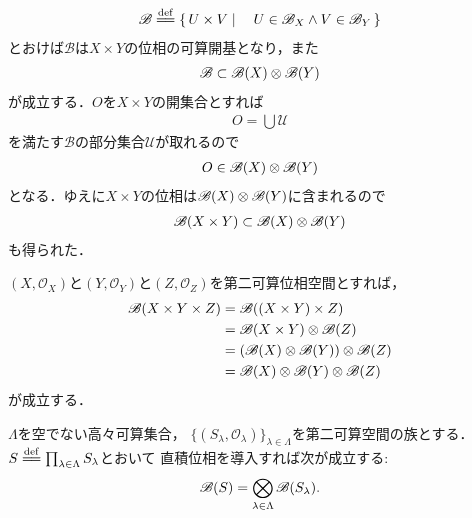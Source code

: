 \begin{sketch}
\begin{align}
			\mathscr{B} \defeq \Set{U \times V}{U \in \mathscr{B}_X \wedge V \in \mathscr{B}_Y}
		\end{align}
		とおけば$\mathscr{B}$は$X \times Y$の位相の可算開基となり，また
		\begin{align}
			\mathscr{B} \subset \mathscr{B}(X) \otimes \mathscr{B}(Y)
		\end{align}
		が成立する．$O$を$X \times Y$の開集合とすれば
		\begin{align}
			O = \bigcup \mathscr{U}
		\end{align}
		を満たす$\mathscr{B}$の部分集合$\mathscr{U}$が取れるので
		\begin{align}
			O \in \mathscr{B}(X) \otimes \mathscr{B}(Y)
		\end{align}
		となる．ゆえに$X \times Y$の位相は$\mathscr{B}(X) \otimes \mathscr{B}(Y)$に含まれるので
		\begin{align}
			\mathscr{B}(X \times Y) \subset \mathscr{B}(X) \otimes \mathscr{B}(Y)
		\end{align}
		も得られた．
		\QED
	\end{sketch}
	
	$(X,\mathscr{O}_X)$と$(Y,\mathscr{O}_Y)$と$(Z,\mathscr{O}_Z)$を第二可算位相空間とすれば，
	\begin{align}
		\mathscr{B}(X \times Y \times Z) &= \mathscr{B}((X \times Y) \times Z) \\
		&= \mathscr{B}(X \times Y) \otimes \mathscr{B}(Z) \\
		&= \left(\mathscr{B}(X) \otimes \mathscr{B}(Y)\right) \otimes \mathscr{B}(Z) \\
		&= \mathscr{B}(X) \otimes \mathscr{B}(Y) \otimes \mathscr{B}(Z)
	\end{align}
	が成立する．
	
	\begin{screen}
		\begin{thm}[第二可算空間の直積のBorel集合族]\label{thm:Borel_algebra_of_products_of_second_countable_spaces}
			$\Lambda$を空でない高々可算集合，
			$\{(S_\lambda,\mathscr{O}_\lambda)\}_{\lambda \in \Lambda}$を第二可算空間の族とする．
			$S \defeq \prod_{\lambda \in \Lambda} S_\lambda$とおいて
			直積位相を導入すれば次が成立する:
			\begin{align}
				\mathscr{B}(S) = \bigotimes_{\lambda \in \Lambda} \mathscr{B}(S_\lambda).
				\label{eq:lem1_for_chap_1_exercise_1_8_1}
			\end{align}
		\end{thm}
	\end{screen}

